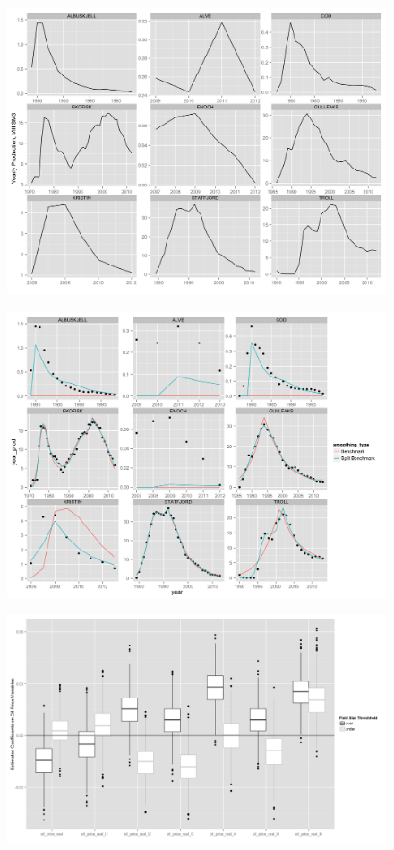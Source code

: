 \documentclass{beamer}
\begin{document}
\begin{frame}[plain]
	\begin{figure}
		\includegraphics[width=.8\textwidth]{figures/field_inspection.png}
		
		\label{field_inspection}
	\end{figure}
\end{frame}


\begin{frame}[plain]
	\begin{figure}
		\includegraphics[width=.8\textwidth]{figures/bench_vs_split.png}
		
		\label{bench_vs_split}
	\end{figure}
\end{frame}


\begin{frame}[plain]
	\begin{figure}
		\includegraphics[width=.8\textwidth]{figures/gam_price_6_print.png}
		
		\label{gam_price_dirty_box}
	\end{figure}
\end{frame}
\end{document}
